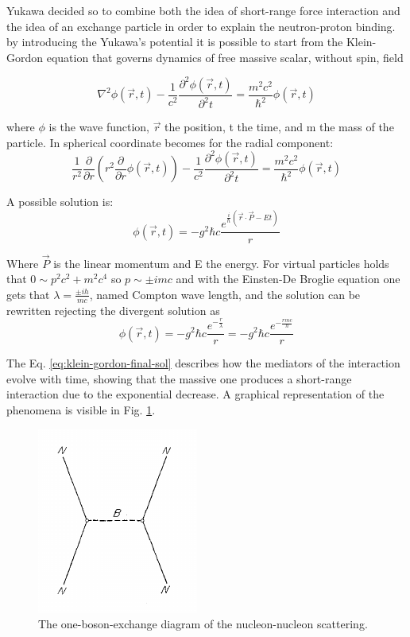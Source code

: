 \documentclass[12pt,a4paper]{book}
\begin{document}
	Yukawa decided so to combine both the idea of short-range force interaction and the idea of an exchange particle in order to explain the neutron-proton binding. by introducing the Yukawa's potential it is possible to start from the Klein-Gordon equation that governs dynamics of free massive scalar, without spin, field
	
	\begin{equation}
		\nabla^2 \phi(\vec{r},t) - \frac{1}{c^2} \frac{\partial^2 \phi(\vec{r},t)}{\partial^2 t} = \frac{m^2 c^2}{\hbar^2} \phi(\vec{r},t)
		\label{eq:klein-gordon}
	\end{equation}
	
	where $\phi$ is the wave function, $\vec{r}$ the position, t the time, and m the mass of the particle. In spherical coordinate becomes for the radial component:
	\begin{equation}
		\frac{1}{r^2} \frac{\partial}{\partial r} (r^2 \frac{\partial}{\partial r} \phi(\vec{r},t)) - \frac{1}{c^2} \frac{\partial^2 \phi(\vec{r},t)}{\partial^2 t} = \frac{m^2 c^2}{\hbar^2} \phi(\vec{r},t)
		\label{eq:klein-gordon-spjericaò}
	\end{equation}
	
	A possible solution is:
	\begin{equation}
		\phi(\vec{r},t)= - g^2 \hbar c \frac{e^{\frac{i}{\hbar}(\vec{r} \cdot \vec{P}- E t)}}{r} 
		\label{eq:klein-gordon-sol}
	\end{equation}
	
	Where $\vec{P}$ is the linear momentum and E the energy. For virtual particles holds that $0 \sim p^2 c^2 + m^2 c^4$ so $p\sim \pm i m c$ and with the Einsten-De Broglie equation one gets that $\lambda = \frac{\pm ih}{mc}$, named Compton wave length, and the solution can be rewritten rejecting the divergent solution as
	\begin{equation}
		\phi(\vec{r},t)= - g^2 \hbar c \frac{e^{-\frac{r}{\lambda}}}{r} = - g^2 \hbar c \frac{e^{-\frac{r mc}{h}}}{r}
		\label{eq:klein-gordon-final-sol}
	\end{equation}
	
	The Eq. \ref{eq:klein-gordon-final-sol} describes how the mediators of the interaction evolve with time, showing that the massive one produces a short-range interaction due to the exponential decrease. A graphical representation of the phenomena is visible in Fig. \ref{fig:one_boson_exchange}.
	\begin{figure}[ht]
		\centering
		\includegraphics[width=0.3\linewidth]{pictures/one_boson_exchange.png}
		\caption{The one-boson-exchange diagram of the nucleon-nucleon scattering.}
		\label{fig:one_boson_exchange} 
	\end{figure}
	
\end{document}
